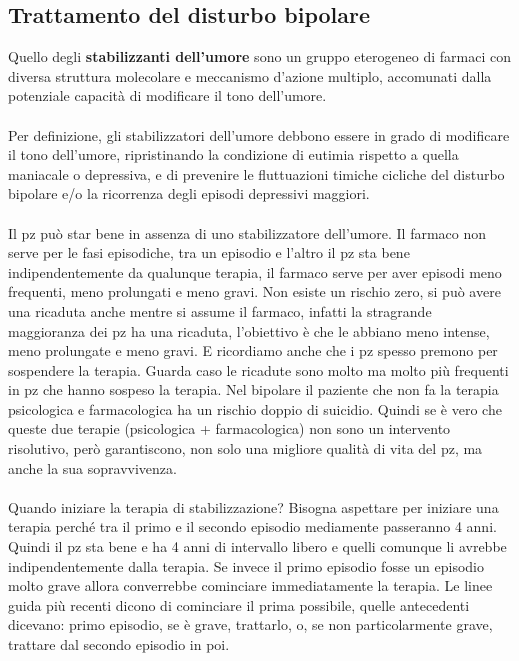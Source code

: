 \subsection{Trattamento del disturbo bipolare}

Quello degli \textbf{stabilizzanti dell'umore} sono un gruppo eterogeneo
di farmaci con diversa struttura molecolare e meccanismo d'azione
multiplo, accomunati dalla potenziale capacità di modificare il tono
dell'umore.
\\\\
Per definizione, gli stabilizzatori dell'umore debbono essere in grado
di modificare il tono dell'umore, ripristinando la condizione di eutimia
rispetto a quella maniacale o depressiva, e di prevenire le fluttuazioni
timiche cicliche del disturbo bipolare e/o la ricorrenza degli episodi
depressivi maggiori.
\\\\
Il pz può star bene in assenza di uno stabilizzatore dell'umore. Il
farmaco non serve per le fasi episodiche, tra un episodio e l'altro il
pz sta bene indipendentemente da qualunque terapia, il farmaco serve per
aver episodi meno frequenti, meno prolungati e meno gravi. Non esiste un
rischio zero, si può avere una ricaduta anche mentre si assume il
farmaco, infatti la stragrande maggioranza dei pz ha una ricaduta,
l'obiettivo è che le abbiano meno intense, meno prolungate e meno gravi.
E ricordiamo anche che i pz spesso premono per sospendere la terapia.
Guarda caso le ricadute sono molto ma molto più frequenti in pz che
hanno sospeso la terapia. Nel bipolare il paziente che non fa la terapia
psicologica e farmacologica ha un rischio doppio di suicidio. Quindi se
è vero che queste due terapie (psicologica + farmacologica) non sono un
intervento risolutivo, però garantiscono, non solo una migliore qualità
di vita del pz, ma anche la sua sopravvivenza.
\\\\
Quando iniziare la terapia di stabilizzazione? Bisogna aspettare per
iniziare una terapia perché tra il primo e il secondo episodio
mediamente passeranno 4 anni. Quindi il pz sta bene e ha 4 anni di
intervallo libero e quelli comunque li avrebbe indipendentemente dalla
terapia. Se invece il primo episodio fosse un episodio molto grave
allora converrebbe cominciare immediatamente la terapia. Le linee guida
più recenti dicono di cominciare il prima possibile, quelle antecedenti
dicevano: primo episodio, se è grave, trattarlo, o, se non
particolarmente grave, trattare dal secondo episodio in poi.

